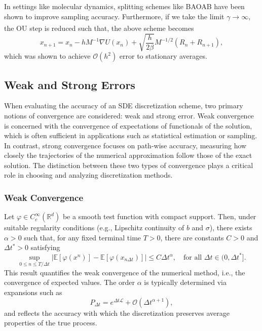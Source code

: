 \documentclass[11pt, twoside]{report}
\begin{document}
In settings like molecular dynamics, splitting schemes like BAOAB have been shown to improve sampling accuracy. Furthermore, if we take the limit $\gamma \xrightarrow[]{} \infty$, the OU step is reduced such that, the above scheme becomes
\begin{equation} \label{eq:baoab_limit_scheme}
    x_{n+1}=x_n-h M^{-1} \nabla U\left(x_n\right)+\sqrt{\frac{h}{2\beta}} M^{-1 / 2}\left(R_n+R_{n+1}\right),
\end{equation}
which was shown to achieve $\mathcal{O}(h^2)$ error to stationary averages.

\subsection{Weak and Strong Errors}
When evaluating the accuracy of an SDE discretization scheme, two primary notions of convergence are considered: weak and strong error.
Weak convergence is concerned with the convergence of expectations of functionals of the solution, which is often sufficient in applications such as statistical estimation or sampling. In contrast, strong convergence focuses on path-wise accuracy, measuring how closely the trajectories of the numerical approximation follow those of the exact solution. The distinction between these two types of convergence plays a critical role in choosing and analyzing discretization methods.

\subsubsection{Weak Convergence}

Let $\varphi \in C^\infty_c(\mathbb{R}^d)$ be a smooth test function with compact support. Then, under suitable regularity conditions (e.g., Lipschitz continuity of $b$ and $\sigma$), there exists $\alpha > 0$ such that, for any fixed terminal time $T > 0$, there are constants $C > 0$ and $\Delta t^* > 0$ satisfying
\[
\sup_{0 \leq n \leq T/\Delta t} \left| \mathbb{E}[\varphi(x^n)] - \mathbb{E}[\varphi(x_{n\Delta t})] \right| \leq C \Delta t^\alpha,
\quad \text{for all } \Delta t \in (0, \Delta t^*].
\]
This result quantifies the weak convergence of the numerical method, i.e., the convergence of expected values. The order $\alpha$ is typically determined via expansions such as
\[
P_{\Delta t} = e^{\Delta t \mathcal{L}} + \mathcal{O}(\Delta t^{\alpha+1}),
\]
and reflects the accuracy with which the discretization preserves average properties of the true process.
\end{document}
